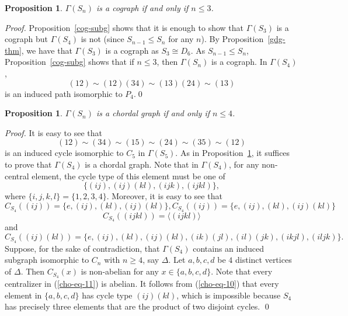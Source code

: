 \documentclass{elsarticle}
\newtheorem{prop}[theorem]{Proposition}
\begin{document}
\begin{prop}\label{syg-cg}
$\Gamma(S_n)$ is a cograph if and only if $n\le 3$.
\end{prop}

\begin{proof}
Proposition~\ref{cog-subg} shows that it is enough to show that $\Gamma(S_3)$ is a
cograph but $\Gamma(S_4)$ is not (since $S_{n-1}\le S_n$ for any $n$).
By Proposition~\ref{gdg-thm}, we have that $\Gamma(S_3)$ is a cograph as $S_3\cong D_{6}$.
As $S_{n-1}\le S_n$, Proposition~\ref{cog-subg} shows that if $n\le 3$, then $\Gamma(S_n)$ is a cograph. In $\Gamma(S_4)$,
$$
(12)\sim(12)(34)\sim(13)(24)\sim(13)
$$
is an induced path isomorphic to $P_4$.\qed
\end{proof}

\begin{prop}\label{sg-chog}
$\Gamma(S_n)$ is a chordal graph if and only if $n\le 4$.
\end{prop}

\begin{proof}
It is easy to see that
$$
(12)\sim(34)\sim(15)\sim(24)
\sim(35)\sim(12)
$$
is an induced cycle isomorphic to $C_{5}$ in $\Gamma(S_5)$. As in
Proposition~\ref{syg-cg}, it suffices to prove that $\Gamma(S_4)$
is a chordal graph. Note that in
$\Gamma(S_4)$, for any non-central element, the cycle type of this element must be one of
\begin{equation}\label{cho-eq-10}
\{(ij), (ij)(kl), (ijk),(ijkl)\},
\end{equation}
where $\{i,j,k,l\}=\{1,2,3,4\}$.
Moreover, it is easy to see that
\[C_{S_4}((ij))=\{e,(ij),(kl),(ij)(kl)\},
C_{S_4}((ij))=\{e,(ij),(kl),(ij)(kl)\}\]
\begin{equation}\label{cho-eq-11}
C_{S_4}((ijkl))=\langle(ijkl)\rangle
\end{equation}
and
$$
C_{S_4}((ij)(kl))=\{e, (ij), (kl), (ij)(kl), (ik)(jl), (il)(jk), (ikjl), (iljk)\}.
$$
Suppose, for the sake of contradiction, that $\Gamma(S_4)$ contains an induced subgraph isomorphic to $C_n$ with $n\ge 4$, say $\Delta$. Let $a,b,c,d$ be $4$ distinct vertices of $\Delta$.
Then $C_{S_4}(x)$ is non-abelian for any $x\in \{a,b,c,d\}$.
Note that every centralizer in (\ref{cho-eq-11}) is abelian. It follows from (\ref{cho-eq-10}) that every element in $\{a,b,c,d\}$ has
cycle type $(ij)(kl)$, which is impossible because $S_4$ has precisely three elements that are the product of two disjoint cycles. \qed
\end{proof}
\end{document}
